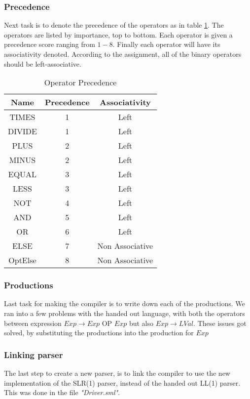 \documentclass[10pt]{article}
\begin{document}
\subsubsection{Precedence}
Next task is to denote the precedence of the operators as in table \ref{tab:op_precedence}. The operators are listed by importance, top to bottom. Each operator is given a precedence score ranging from \(1-8\). Finally each operator will have its associativity denoted. According to the assignment, all of the binary operators should be left-associative.

\begin{table}
\begin{center}
\begin{tabular}{|c|c|c|}
\hline
Name & Precedence & Associativity\\
\hline
TIMES & 1 & Left\\
DIVIDE & 1 & Left\\
PLUS & 2 & Left\\
MINUS & 2 & Left\\
EQUAL & 3 & Left\\
LESS & 3 & Left\\
NOT & 4 & Left\\
AND & 5 & Left\\
OR & 6 & Left\\
ELSE & 7 & Non Associative\\
OptElse & 8 & Non Associative\\
\hline
\end{tabular}
\end{center}
\caption{\label{tab:op_precedence}Operator Precedence}
\end{table}


\subsubsection{Productions}
Last task for making the compiler is to write down each of the productions. We ran into a few problems with the handed out language, with both the operators between expression $Exp \rightarrow Exp \text{ OP } Exp$ but also $Exp \rightarrow LVal$. These issues got solved, by substituting the productions into the production for $Exp$

\subsubsection{Linking parser}
The last step to create a new parser, is to link the compiler to use the new implementation of the SLR(1) parser, instead of the handed out LL(1) parser. This was done in the file \textit{"Driver.sml"}.
\end{document}

